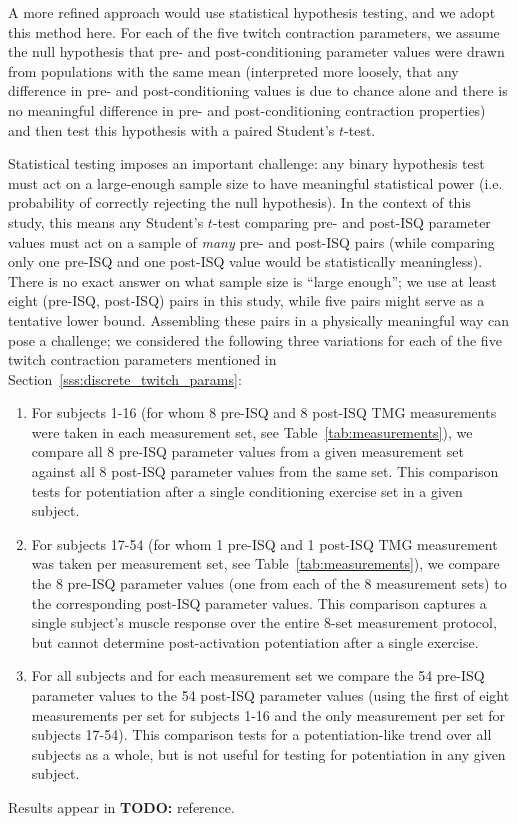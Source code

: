 \documentclass[utf8]{style/FrontiersinHarvard}
\newcommand{\TODO}[1]{{\textbf{TODO:} {\color{red} #1}}}
\begin{document}
A more refined approach would use statistical hypothesis testing, and we adopt this method here.
For each of the five twitch contraction parameters, we assume the null hypothesis that pre- and post-conditioning parameter values were drawn from populations with the same mean
(interpreted more loosely, that any difference in pre- and post-conditioning values is due to chance alone and there is no meaningful difference in pre- and post-conditioning contraction properties)
and then test this hypothesis with a paired Student's $ t $-test.

Statistical testing imposes an important challenge: any binary hypothesis test must act on a large-enough sample size to have meaningful statistical power (i.e. probability of correctly rejecting the null hypothesis).
In the context of this study, this means any Student's $ t $-test comparing pre- and post-ISQ parameter values must act on a sample of \textit{many} pre- and post-ISQ pairs (while comparing only one pre-ISQ and one post-ISQ value would be statistically meaningless).
There is no exact answer on what sample size is ``large enough''; we use at least eight (pre-ISQ, post-ISQ) pairs in this study, while five pairs might serve as a tentative lower bound.
Assembling these pairs in a physically meaningful way can pose a challenge;
we considered the following three variations for each of the five twitch contraction parameters mentioned in Section~\ref{sss:discrete_twitch_params}:
\begin{enumerate}

    \item For subjects 1-16 (for whom 8 pre-ISQ and 8 post-ISQ TMG measurements were taken in each measurement set, see Table~\ref{tab:measurements}), we compare all 8 pre-ISQ parameter values from a given measurement set against all 8 post-ISQ parameter values from the same set.
    This comparison tests for potentiation after a single conditioning exercise set in a given subject.

    \item For subjects 17-54 (for whom 1 pre-ISQ and 1 post-ISQ TMG measurement was taken per measurement set, see Table~\ref{tab:measurements}), we compare the 8 pre-ISQ parameter values (one from each of the 8 measurement sets) to the corresponding post-ISQ parameter values.
    This comparison captures a single subject's muscle response over the entire 8-set measurement protocol, but cannot determine post-activation potentiation after a single exercise.

    \item For all subjects and for each measurement set we compare the 54 pre-ISQ parameter values to the 54 post-ISQ parameter values (using the first of eight measurements per set for subjects 1-16 and the only measurement per set for subjects 17-54).
    This comparison tests for a potentiation-like trend over all subjects as a whole, but is not useful for testing for potentiation in any given subject.

\end{enumerate}
Results appear in \TODO{reference}.
\end{document}
